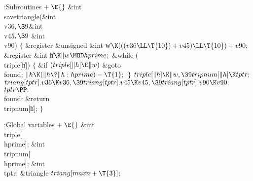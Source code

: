 \Y\B\4:Subroutines\X${}\mathrel+\E{}$\6
\&{int} \\{savetriangle}(\&{int} \\{v36}${},\39{}$\&{int} \\{v45}${},\39{}$%
\&{int} \\{v90})\1\1\2\2\6
${}\{{}$\1\6
\&{register} \&{unsigned} \&{int} \|w${}\K(((\\{v36}\LL\T{10})+\\{v45})\LL%
\T{10})+\\{v90};{}$\6
\&{register} \&{int} \|h${}\K\|w\MOD\\{hprime};{}$\7
\&{while} (\\{triple}[\|h])\5
${}\{{}$\1\6
\&{if} ${}(\\{triple}[\|h]\E\|w){}$\1\5
\&{goto} \\{found};\2\6
${}\|h\K(\|h\?\|h:\\{hprime})-\T{1};{}$\6
\4${}\}{}$\2\6
${}\\{triple}[\|h]\K\|w,\39\\{tripnum}[\|h]\K\\{tptr};{}$\6
${}\\{triang}[\\{tptr}].\\{v36}\K\\{v36},\39\\{triang}[\\{tptr}].\\{v45}\K%
\\{v45},\39\\{triang}[\\{tptr}].\\{v90}\K\\{v90};{}$\6
${}\\{tptr}\PP;{}$\6
\4\\{found}:\5
\&{return} \\{tripnum}[\|h];\6
\4${}\}{}$\2\par
\fi

\B{}:Global variables\X${}\mathrel+\E{}$\6
\&{int} \\{triple}[\\{hprime}];\6
\&{int} \\{tripnum}[\\{hprime}];\6
\&{int} \\{tptr};\6
\&{triangle} ${}\\{triang}[\\{maxn}+\T{3}]{}$;\par
\fi

